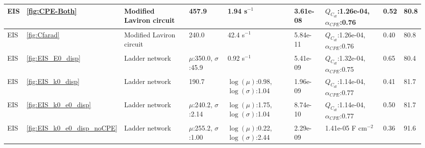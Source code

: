 \begin{table}[]
\begin{tabular}{|l|l|l|llllll|}
EIS &                     \ref{fig:CPE-Both} &                       Modified Laviron circuit &                      \multicolumn{1}{l|}{457.9}&           \multicolumn{1}{l|}{1.94 s$^{-1}$}&      \multicolumn{1}{l|}{3.61e-08}&                        \multicolumn{1}{l|}{$Q_{C_{dl}}$:1.26e-04, $\alpha_{CPE}$:0.76}&         \multicolumn{1}{l|}{0.52}&         80.8              \\ \hline
EIS &                     \ref{fig:Cfarad} &                       Modified Laviron circuit &                      \multicolumn{1}{l|}{240.0}&           \multicolumn{1}{l|}{42.4 s$^{-1}$}&      \multicolumn{1}{l|}{5.84e-11}&                        \multicolumn{1}{l|}{$Q_{C_{dl}}$:1.26e-04, $\alpha_{CPE}$:0.76}&         \multicolumn{1}{l|}{0.40}&         80.8              \\ \hline
EIS &                     \ref{fig:EIS_E0_disp} &                       Ladder network &                      \multicolumn{1}{l|}{$\mu$:350.0, $\sigma$:45.9}&           \multicolumn{1}{l|}{0.92 s$^{-1}$}&      \multicolumn{1}{l|}{5.41e-09}&                        \multicolumn{1}{l|}{$Q_{C_{dl}}$:1.32e-04, $\alpha_{CPE}$:0.75}&         \multicolumn{1}{l|}{0.65}&         80.4              \\ \hline
EIS &                     \ref{fig:EIS_k0_disp} &                       Ladder network &                      \multicolumn{1}{l|}{190.7}&           \multicolumn{1}{l|}{$\log(\mu)$:0.98, $\log(\sigma)$:1.04}&      \multicolumn{1}{l|}{1.96e-09}&                        \multicolumn{1}{l|}{$Q_{C_{dl}}$:1.14e-04, $\alpha_{CPE}$:0.77}&         \multicolumn{1}{l|}{0.41}&         81.7              \\ \hline
EIS &                     \ref{fig:EIS_k0_e0_disp} &                       Ladder network &                      \multicolumn{1}{l|}{$\mu$:240.2, $\sigma$:2.14}&           \multicolumn{1}{l|}{$\log(\mu)$:1.75, $\log(\sigma)$:1.04}&      \multicolumn{1}{l|}{8.74e-10}&                        \multicolumn{1}{l|}{$Q_{C_{dl}}$:1.14e-04, $\alpha_{CPE}$:0.77}&         \multicolumn{1}{l|}{0.50}&         81.7              \\ \hline
EIS &                     \ref{fig:EIS_k0_e0_disp_noCPE} &                       Ladder network &                      \multicolumn{1}{l|}{$\mu$:255.2, $\sigma$:1.00}&           \multicolumn{1}{l|}{$\log(\mu)$:0.22, $\log(\sigma)$:2.44}&      \multicolumn{1}{l|}{2.29e-09}&                        \multicolumn{1}{l|}{1.41e-05 F cm$^{-2}$}&         \multicolumn{1}{l|}{0.36}&         91.6              \\ \hline
\end{tabular}
\end{table}